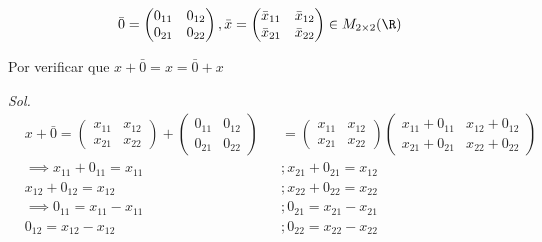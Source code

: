 \begin{exercise}
	\begin{equation*}
		\bar{0}=\begin{pmatrix}
			0_{11} & 0_{12} \\0_{21}&0_{22}
		\end{pmatrix}, \bar{x}=\begin{pmatrix}
			\bar{x}_{11} & \bar{x}_{12} \\ \bar{x}_{21}&\bar{x}_{22}
		\end{pmatrix}\in M_{2\times 2}(\R)
	\end{equation*}

	Por verificar que $x+\bar{0}=x=\bar{0}+x$

	\textit{ Sol. }
	\begin{align*}
		 & x+\bar{0}=\begin{pmatrix}
			             x_{11} & x_{12} \\x_{21}&x_{22}
		             \end{pmatrix}+\begin{pmatrix}
			                           0_{11} & 0_{12} \\0_{21}&0_{22}
		                           \end{pmatrix} &  & =\begin{pmatrix}
			                                               x_{11} & x_{12} \\x_{21}&x_{22}
		                                               \end{pmatrix}\begin{pmatrix}
			                                                            x_{11}+0_{11} & x_{12}+0_{12} \\x_{21}+0_{21}&x_{22}+0_{22}
		                                                            \end{pmatrix} \\
		 & \implies x_{11}+0_{11}=x_{11}   &  & ;x_{21}+0_{21}=x_{12}                                                          \\
		 & x_{12}+0_{12}=x_{12}            &  & ;x_{22}+0_{22}=x_{22}                                                          \\
		 & \implies 0_{11}=x_{11}-x_{11}   &  & ;0_{21}=x_{21}-x_{21}                                                          \\
		 & 0_{12}=x_{12}-x_{12}            &  & ;0_{22}=x_{22}-x_{22}                                                          \\

\end{align*}
\end{exercise}
